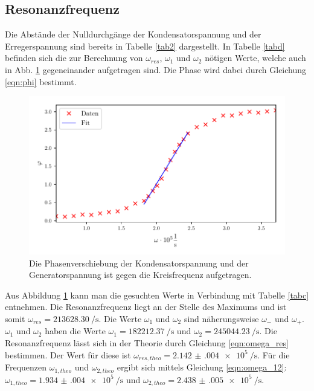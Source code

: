 \subsection{Resonanzfrequenz} %
Die Abstände der Nulldurchgänge der Kondensatorspannung und
der Erregerspannung sind bereits in Tabelle \ref{tab2}
dargestellt. In Tabelle \ref{tabd} befinden sich die
zur Berechnung von $\omega_{res}$, $\omega_{1}$ und $\omega_{2}$
nötigen Werte, welche auch in Abb. \ref{fig:plotd} gegeneinander
aufgetragen sind. Die Phase wird dabei durch Gleichung \eqref{eqn:phi}
bestimmt.

\begin{figure}
  \centering
  \includegraphics{build/plotd.pdf}
  \caption{Die Phasenverschiebung der Kondensatorspannung und der
  Generatorspannung ist gegen die Kreisfrequenz aufgetragen.}
  \label{fig:plotd}
\end{figure}
\noindent Aus Abbildung \ref{fig:plotd} kann man die gesuchten Werte in Verbindung mit Tabelle
\ref{tabc} entnehmen.
Die Resonanzfrequenz liegt an der Stelle des Maximums und ist somit
 $\omega_{res} = \SI[per-mode=fraction]{213628.30}{\per\second}$.
Die Werte $\omega_{1}$ und $\omega_{2}$ sind näherungsweise $\omega_{-}$ und $\omega_{+}$.
$\omega_{1}$ und $\omega_{2}$ haben die Werte
$\omega_{1} = \SI[per-mode=fraction]{182212.37}{\per\second}$ und
$\omega_{2} = \SI[per-mode=fraction]{245044.23}{\per\second}$.
\newline
Die Resonanzfrequenz lässt sich in der Theorie durch 
Gleichung \eqref{eqn:omega_res} bestimmen.
Der Wert für diese ist $\omega_{res,theo} = \SI[per-mode=fraction]{2.142(004)e5}{\per\second}$.
Für die Frequenzen $\omega_{1,theo}$ und $\omega_{2,theo}$ ergibt sich
mittels Gleichung \eqref{eqn:omega_12}:
$\omega_{1,theo} = \SI[per-mode=fraction]{1.934(004)e5}{\per\second}$ und
$\omega_{2,theo} = \SI[per-mode=fraction]{2.438(005)e5}{\per\second}$.

